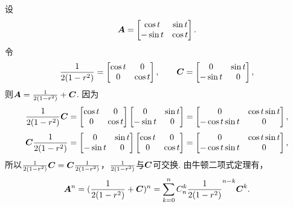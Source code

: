 \begin{example}
设\[
	\boldsymbol{A} = \begin{bmatrix}
	\cos t & \sin t \\
	-\sin t & \cos t
	\end{bmatrix}.
\]
令\[
	\frac{1}{2(1-r^2)} = \begin{bmatrix}
		\cos t & 0 \\
		0 & \cos t
	\end{bmatrix},
	\qquad
	\boldsymbol{C} = \begin{bmatrix}
		0 & \sin t \\
		-\sin t & 0
	\end{bmatrix},
\]
则\(\boldsymbol{A}=\frac{1}{2(1-r^2)}+\boldsymbol{C}\).
因为\[
	\frac{1}{2(1-r^2)}\boldsymbol{C} = \begin{bmatrix}
		\cos t & 0 \\
		0 & \cos t
	\end{bmatrix}
	\begin{bmatrix}
		0 & \sin t \\
		-\sin t & 0
	\end{bmatrix}
	= \begin{bmatrix}
		0 & \cos t \sin t \\
		-\cos t \sin t & 0
	\end{bmatrix},
\]\[
	\boldsymbol{C}\frac{1}{2(1-r^2)} = \begin{bmatrix}
		0 & \sin t \\
		-\sin t & 0
	\end{bmatrix}
	\begin{bmatrix}
		\cos t & 0 \\
		0 & \cos t
	\end{bmatrix}
	= \begin{bmatrix}
		0 & \cos t \sin t \\
		-\cos t \sin t & 0
	\end{bmatrix},
\]
所以\(\frac{1}{2(1-r^2)}\boldsymbol{C}=\boldsymbol{C}\frac{1}{2(1-r^2)}\)，\(\frac{1}{2(1-r^2)}\)与\(\boldsymbol{C}\)可交换.
由牛顿二项式定理有，\[
	\boldsymbol{A}^n=(\frac{1}{2(1-r^2)}+\boldsymbol{C})^n
	=\sum\limits_{k=0}^n C_n^k \frac{1}{2(1-r^2)}^{n-k} \boldsymbol{C}^k.
\]
\end{example}
